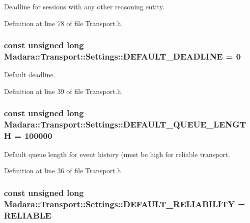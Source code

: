 Deadline for sessions with any other reasoning entity. 



Definition at line 78 of file Transport.h.

\hypertarget{classMadara_1_1Transport_1_1Settings_a20f9e030cad28fd6c92e134613f4c903}{
\subsubsection[{DEFAULT\_\-DEADLINE}]{\setlength{\rightskip}{0pt plus 5cm}const unsigned long {\bf Madara::Transport::Settings::DEFAULT\_\-DEADLINE} = 0}}
\label{d1/d14/classMadara_1_1Transport_1_1Settings_a20f9e030cad28fd6c92e134613f4c903}


Default deadline. 



Definition at line 39 of file Transport.h.

\hypertarget{classMadara_1_1Transport_1_1Settings_a27572b46bf3f74df9009f9e4adda6325}{
\subsubsection[{DEFAULT\_\-QUEUE\_\-LENGTH}]{\setlength{\rightskip}{0pt plus 5cm}const unsigned long {\bf Madara::Transport::Settings::DEFAULT\_\-QUEUE\_\-LENGTH} = 100000}}
\label{d1/d14/classMadara_1_1Transport_1_1Settings_a27572b46bf3f74df9009f9e4adda6325}


Default queue length for event history (must be high for reliable transport. 



Definition at line 36 of file Transport.h.

\hypertarget{classMadara_1_1Transport_1_1Settings_a291cf13dbc19a475e95172d9adf7e97c}{
\subsubsection[{DEFAULT\_\-RELIABILITY}]{\setlength{\rightskip}{0pt plus 5cm}const unsigned long {\bf Madara::Transport::Settings::DEFAULT\_\-RELIABILITY} = RELIABLE}}
\label{d1/d14/classMadara_1_1Transport_1_1Settings_a291cf13dbc19a475e95172d9adf7e97c}


